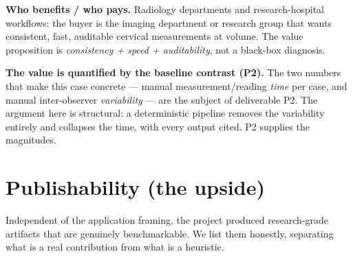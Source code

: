 \documentclass[11pt]{article}
\begin{document}
\noindent\textbf{Who benefits / who pays.} Radiology departments and research-hospital workflows: the
buyer is the imaging department or research group that wants consistent, fast, auditable cervical
measurements at volume. The value proposition is \emph{consistency + speed + auditability}, not a
black-box diagnosis.

\medskip
\noindent\textbf{The value is quantified by the baseline contrast (P2).} The two numbers that make this
case concrete --- manual measurement/reading \emph{time} per case, and manual inter-observer
\emph{variability} --- are the subject of deliverable P2. The argument here is structural: a
deterministic pipeline removes the variability entirely and collapses the time, with every output cited.
P2 supplies the magnitudes.

\section{Publishability (the upside)}
Independent of the application framing, the project produced research-grade artifacts that are
genuinely benchmarkable. We list them honestly, separating what is a real contribution from what is a
heuristic.
\end{document}
